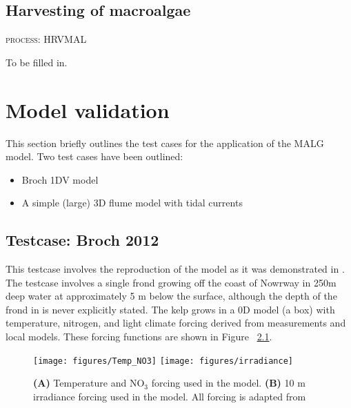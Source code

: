 \documentclass{deltares_manual}
\begin{document}
\section{Harvesting of macroalgae}
\begin{flushright}
	\textsc{process: HRVMAL}
\end{flushright}
To be filled in.
\pagebreak

\chapter{Model validation}
This section briefly outlines the test cases for the application of the MALG model. Two test cases have been outlined:
\begin{itemize}
	\item Broch 1DV model
	\item A simple (large) 3D flume model with tidal currents
\end{itemize}
\section{Testcase: Broch 2012}
This testcase involves the reproduction of the model as it was demonstrated in \cite{broch2012}. The testcase involves a single frond growing off the coast of Nowrway in 250m deep water at approximately 5 m below the surface, although the depth of the frond in \cite{broch2012} is never explicitly stated. The kelp grows in a 0D model (a box) with temperature, nitrogen, and light climate forcing derived from measurements and local models. These forcing functions are shown in Figure ~\ref{fig:forcing}.

\begin{figure}[H]
	\centering
	\texttt{[image: figures/Temp\_NO3]}
	\texttt{[image: figures/irradiance]}
	\caption[]{\textbf{(A)} Temperature and NO$_{3}$ forcing used in the model. \textbf{(B)} 10 m irradiance forcing used in the model. All forcing is adapted from \cite{broch2012}}
	\label{fig:forcing}
\end{figure}
\end{document}
